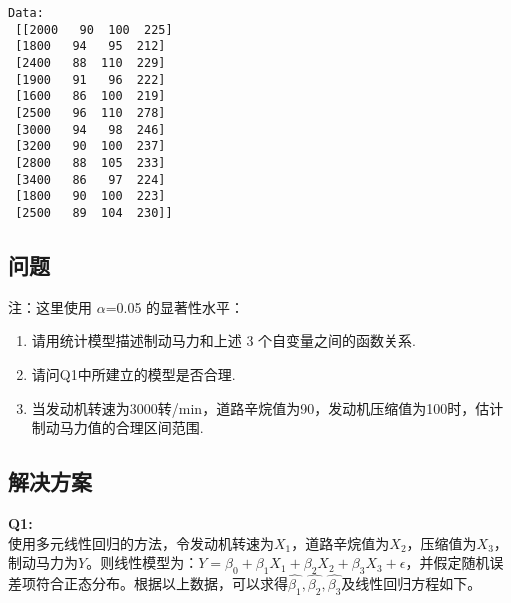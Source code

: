 \documentclass[11pt]{ctexart}
\providecommand{\tightlist}{%
      \setlength{\itemsep}{0pt}\setlength{\parskip}{0pt}}
\begin{document}
    \begin{Verbatim}[commandchars=\\\{\}]
Data:
 [[2000   90  100  225]
 [1800   94   95  212]
 [2400   88  110  229]
 [1900   91   96  222]
 [1600   86  100  219]
 [2500   96  110  278]
 [3000   94   98  246]
 [3200   90  100  237]
 [2800   88  105  233]
 [3400   86   97  224]
 [1800   90  100  223]
 [2500   89  104  230]]
    \end{Verbatim}

    \hypertarget{ux95eeux9898}{%
\subsection{问题}\label{ux95eeux9898}}

注：这里使用 \(\alpha\)=0.05 的显著性水平：

\begin{enumerate}
\def\labelenumi{\arabic{enumi}.}
\tightlist
\item
  请用统计模型描述制动马力和上述 3 个自变量之间的函数关系.
\item
  请问Q1中所建立的模型是否合理.
\item
  当发动机转速为3000转/min，道路辛烷值为90，发动机压缩值为100时，估计制动马力值的合理区间范围.
\end{enumerate}

\hypertarget{ux89e3ux51b3ux65b9ux6848}{%
\subsection{解决方案}\label{ux89e3ux51b3ux65b9ux6848}}

    \textbf{Q1:}\\
使用多元线性回归的方法，令发动机转速为\(X_1\)，道路辛烷值为\(X_2\)，压缩值为\(X_3\)，制动马力为\(Y\)。则线性模型为：\(Y = \beta_0 + \beta_1X_1 + \beta_2X_2 + \beta_3X_3 +\epsilon\)，并假定随机误差项符合正态分布。根据以上数据，可以求得\(\hat{\beta_1},\hat{\beta_2},\hat{\beta_3}\)及线性回归方程如下。
\end{document}
